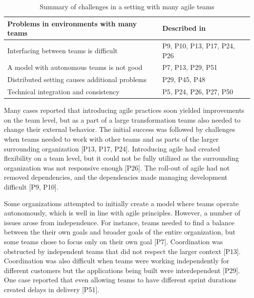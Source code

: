 \begin{table}[h]
    \centering
    \begin{tabular}{ >{\raggedright\arraybackslash}p{}
                     >{\raggedright\arraybackslash}p{} }
        \toprule
        Problems in environments with many teams  &  Described in \\
        \midrule
        Interfacing between teams is difficult     &  P9, P10, P13, P17, P24, P26 \\
        A model with autonomous teams is not good  &  P7, P13, P29, P51  \\
        Distributed setting causes additional problems  &  P29, P45, P48  \\
        Technical integration and consistency      &  P5, P24, P26, P27, P50  \\
        \bottomrule
    \end{tabular}
    \caption{Summary of challenges in a setting with many agile teams}
    \label{table:challenges_coordinatingteams}
\end{table}

Many cases reported that introducing agile practices soon yielded improvements
on the team level, but as a part of a large transformation teams also needed to
change their external behavior.
The initial success was followed by challenges when teams needed to work with
other teams and as parts of the larger surrounding organization [P13, P17, P24].
Introducing agile had created flexibility on a team level, but it could not be
fully utilized as the surrounding organization was not responsive enough [P26].
The roll-out of agile had not removed dependencies, and the dependencies
made managing development difficult [P9, P10].


Some organizations attempted to initially create a model where teams operate
autonomously, which is well in line with agile principles. However, a number of
issues arose from independence. For instance, teams needed to find a balance
between the their own goals and broader goals of the entire organization, but
some teams chose to focus only on their own goal [P7]. Coordination was
obstructed by independent teams that did not respect the larger context [P13].
Coordination was also difficult when teams were working independently for
different customers but the applications being built were interdependent [P29].
One case reported that even allowing teams to have different sprint durations
created delays in delivery [P51].


